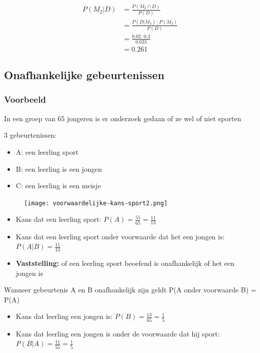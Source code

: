 \documentclass{article}
\begin{document}
\begin{center}
    \begin{align*}
        P(M_2 | D) & = \frac{P(M_2 \cap D)}{P(D)}\\
        & = \frac{P(D | M_2) \cdot P(M_2)}{P(D)}\\
        & = \frac{0.02 \cdot 0.3}{0.023}\\
        & = 0.261
    \end{align*}
\end{center}

\subsection{Onafhankelijke gebeurtenissen}

\subsubsection{Voorbeeld}

In een groep van 65 jongeren is er onderzoek gedaan of ze wel of niet sporten

3 gebeurtenissen:

\begin{itemize}
    \item A: een leerling sport
    \item B: een leerling is een jongen
    \item C: een leerling is een meisje
\end{itemize}

\begin{figure}[H]
    \centering
    \texttt{[image: voorwaardelijke-kans-sport2.png]}
\end{figure}

\begin{itemize}
    \item Kans dat een leerling sport: $P(A) = \frac{55}{65} = \frac{11}{13}$
    \item Kans dat een leerling sport onder voorwaarde dat het een jongen is: $P(A | B) = \frac{11}{13}$
    \item \textbf{Vaststelling:} of een leerling sport beoefend is onafhankelijk of het een jongen is
\end{itemize}

Wanneer gebeurtenis A en B onafhankelijk zijn geldt P(A onder voorwaarde B) = P(A)

\begin{itemize}
    \item Kans dat leerling een jongen is: $P(B) = \frac{13}{65}= \frac15$
    \item Kans dat leerling een jongen is onder de voorwaarde dat hij sport: $P(B|A) = \frac{11}{55}= \frac15$
\end{itemize}
\end{document}
